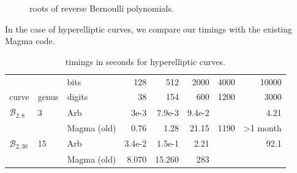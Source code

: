 \documentclass[main.tex]{subfiles}
\begin{document}
  \begin{figure}[H]
      \begin{center}
      \end{center}
      \caption{roots of reverse Bernoulli polynomials.}
  \label{fig:roots_bern}
  \end{figure}

  In the case of hyperelliptic curves, we compare our timings with the existing Magma code.
      \begin{center}
          \begin{table}[h!]
      \begin{tabular}{lllrrrrr}
          \toprule
          & & bits & 128 & 512 & 2000 & 4000 & 10000 \\
          curve & genus & digits & 38 & 154 & 600 & 1200 & 3000 \\
          \midrule
          $\mathcal{B}_{2,8}$ & 3
          & Arb   & 3e-3 & 7.9e-3 & 9.4e-2 & & 4.21            \\
          & & Magma (old) & 0.76 & 1.28 & 21.15 & 1190 & >1 month \\
          \midrule
          $\mathcal{B}_{2,30}$ & 15
          & Arb & 3.4e-2 & 1.5e-1 & 2.21 & & 92.1 \\
          & & Magma (old) & 8.070 & 15.260 & 283 & \\
          \bottomrule
      \end{tabular}
      \caption{timings in seconds for hyperelliptic curves.}
  \end{table}
      \end{center}

 
\biblio
\end{document}
